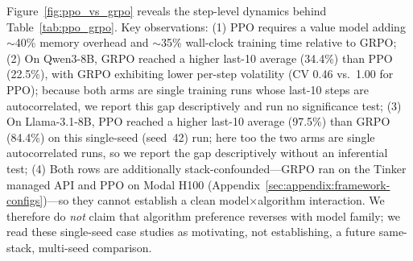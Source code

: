 \documentclass{article}
\begin{document}
Figure~\ref{fig:ppo_vs_grpo} reveals the step-level dynamics behind Table~\ref{tab:ppo_grpo}.
Key observations:
(1) PPO requires a value model adding $\sim$40\% memory overhead and
$\sim$35\% wall-clock training time relative to GRPO;
(2) On Qwen3-8B, GRPO reached a higher last-10 average (34.4\%) than PPO (22.5\%),
with GRPO exhibiting lower per-step volatility (CV 0.46 vs.~1.00 for PPO);
because both arms are single training runs whose last-10 steps are
autocorrelated, we report this gap descriptively and run no significance test;
(3) On Llama-3.1-8B, PPO reached a higher last-10 average (97.5\%) than GRPO
(84.4\%) on this single-seed (seed~42) run; here too the two arms are single
autocorrelated runs, so we report the gap descriptively without an inferential
test;
(4) Both rows are additionally stack-confounded---GRPO ran on the Tinker managed
API and PPO on Modal H100 (Appendix~\ref{sec:appendix:framework-configs})---so
they cannot establish a clean model$\times$algorithm interaction. We therefore do
\emph{not} claim that algorithm preference reverses with model family; we read
these single-seed case studies as motivating, not establishing, a future
same-stack, multi-seed comparison.
\end{document}
